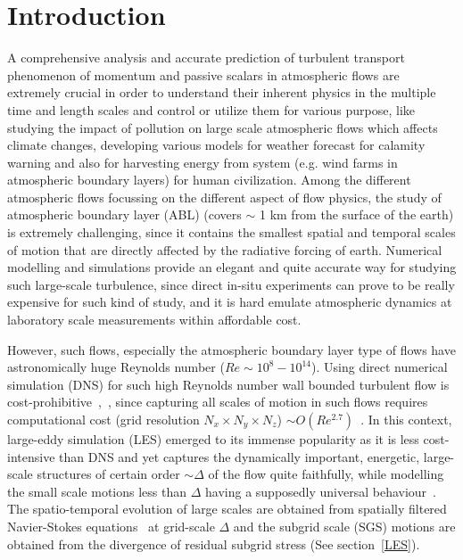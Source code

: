 \documentclass[times]{fldauth}
\begin{document}
\vspace{-6pt}

\section{Introduction}
\vspace{-2pt}
A comprehensive analysis and accurate prediction of turbulent transport phenomenon of momentum and passive scalars in atmospheric flows are extremely crucial in order to understand their inherent physics in the multiple time and length scales and control or utilize them for various purpose, like studying the impact of pollution on large scale atmospheric flows which affects climate changes, developing various models for weather forecast for calamity warning and also for harvesting energy from system (e.g. wind farms in atmospheric boundary layers) for human civilization. Among the different atmospheric flows focussing on the different aspect of flow physics, the study of atmospheric boundary layer (ABL) (covers $\sim$ 1 km from the surface of the earth) is extremely challenging, since it contains the smallest spatial and temporal scales of motion that are directly affected by the radiative forcing of earth. Numerical modelling and simulations provide an elegant and quite accurate way for studying such large-scale turbulence, since direct in-situ experiments can prove to be really expensive for such kind of study, and it is hard emulate atmospheric dynamics at laboratory scale measurements within affordable cost.
\par
However, such flows, especially the atmospheric boundary layer type of flows have astronomically huge Reynolds number ($Re \sim 10^{8}-10^{14}$). Using direct numerical simulation (DNS) for such high Reynolds number wall bounded turbulent flow is cost-prohibitive~\cite{pope},~\cite{pio2}, since capturing all scales of motion in such flows requires computational cost  (grid resolution $N_x\times N_y\times N_z$) $\sim O(Re^{2.7})$~\cite{rey}. In this context, large-eddy simulation (LES) emerged to its immense popularity as it is less cost-intensive than DNS and yet captures the dynamically important, energetic, large-scale structures of certain order $\sim \Delta$ of the flow quite faithfully, while modelling the small scale motions less than $\Delta$ having a supposedly universal behaviour~\cite{frid,pio,pio3,porte1fun}. The spatio-temporal evolution of large scales are obtained from spatially filtered Navier-Stokes equations~\cite{deardoff,schumann,germano,moeng1} at grid-scale $\Delta$ and the subgrid scale (SGS) motions are obtained from the divergence of residual subgrid stress (See section~\ref{LES}).
\end{document}
